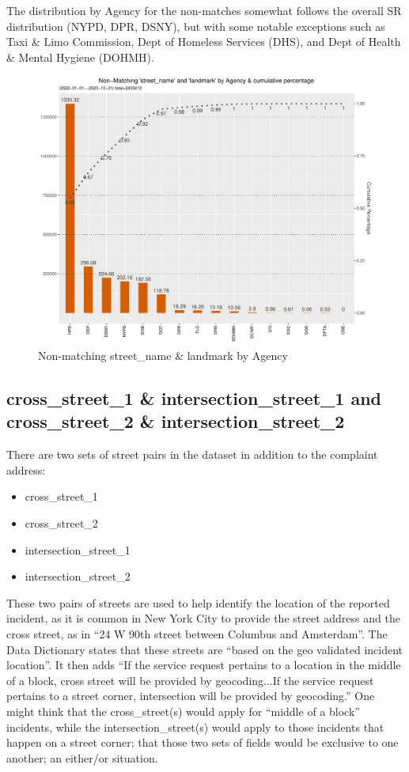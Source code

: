 \documentclass[12pt, titlepage]{article}
\begin{document}
The distribution by Agency for the non-matches somewhat follows 
the overall SR distribution (NYPD, DPR, DSNY), but with some notable 
exceptions such as Taxi \& Limo Commission, Dept of Homeless 
Services (DHS), and Dept of Health \& Mental Hygiene (DOHMH).

\begin{figure}[tbp]
	\centering
  	\includegraphics[width = \textwidth]
  	{non-matchingstreet_nameandlandmark.pdf}
  	\caption{Non-matching street\_name \& landmark by Agency}
  	\label{fig:landmarkchart}
\end{figure}	
	
\subsection{cross\_street\_1 \& intersection\_street\_1 and cross\_street\_2 
\& intersection\_street\_2}
\label{sec:street1}
There are two sets of street pairs in the dataset in addition to 
the complaint address:

\begin{itemize}
	\item cross\_street\_1
	\item cross\_street\_2
	\item intersection\_street\_1
	\item intersection\_street\_2
\end{itemize}
	
These two pairs of streets are used to help identify the location of the 
reported incident, as it is common in New York City to provide the 
street address and the cross street, as in ``24 W 90th street between 
Columbus and Amsterdam''. The Data Dictionary states that these 
streets are ``based on the geo validated incident location''. It then 
adds ``If the service request pertains to a location in the middle of a 
block, cross street will be provided by geocoding...If the service 
request pertains to a street corner, intersection will be provided by 
geocoding.''  One might think that the cross\_street(s) would apply 
for ``middle of a block'' incidents, while the intersection\_street(s) 
would apply to those incidents that happen on a street corner; 
that those two sets of fields would be exclusive to one another; 
an either/or situation. 
\end{document}
